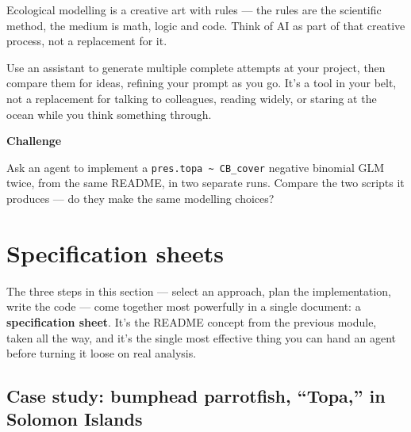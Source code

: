 \documentclass[
  letterpaper,
  DIV=11,
  numbers=noendperiod]{scrreprt}
\begin{document}
Ecological modelling is a creative art with rules --- the rules are the
scientific method, the medium is math, logic and code. Think of AI as
part of that creative process, not a replacement for it.

Use an assistant to generate multiple complete attempts at your project,
then compare them for ideas, refining your prompt as you go. It's a tool
in your belt, not a replacement for talking to colleagues, reading
widely, or staring at the ocean while you think something through.

\begin{tcolorbox}[enhanced jigsaw, toprule=.15mm, rightrule=.15mm, left=2mm, leftrule=.75mm, breakable, opacityback=0, arc=.35mm, colframe=quarto-callout-important-color-frame, bottomrule=.15mm, colback=white]
\begin{minipage}[t]{5.5mm}
\textcolor{quarto-callout-important-color}{\faExclamation}
\end{minipage}%
\begin{minipage}[t]{\textwidth - 5.5mm}

\vspace{-3mm}\textbf{Challenge}\vspace{3mm}

Ask an agent to implement a
\texttt{pres.topa\ \textasciitilde{}\ CB\_cover} negative binomial GLM
twice, from the same README, in two separate runs. Compare the two
scripts it produces --- do they make the same modelling choices?

\end{minipage}%
\end{tcolorbox}

\chapter{Specification sheets}\label{specification-sheets}

The three steps in this section --- select an approach, plan the
implementation, write the code --- come together most powerfully in a
single document: a \textbf{specification sheet}. It's the README concept
from the previous module, taken all the way, and it's the single most
effective thing you can hand an agent before turning it loose on real
analysis.

\section{Case study: bumphead parrotfish, ``Topa,'' in Solomon
Islands}\label{case-study-bumphead-parrotfish-topa-in-solomon-islands}
\end{document}
